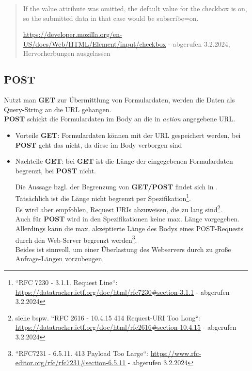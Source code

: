 \blockquote[{\url{https://developer.mozilla.org/en-US/docs/Web/HTML/Element/input/checkbox} - abgerufen 3.2.2024, Hervorherbungen ausgelassen}]{
    If the value attribute was omitted, the default value for the checkbox is on, so the submitted data in that case would be subscribe=on.
}

\subsection{POST}

Nutzt man \textbf{GET} zur Übermittlung von Formulardaten, werden die Daten als Query-String an die URL gehangen.\\

\noindent
\textbf{POST} schickt die Formulardaten im Body an die in \textit{action} angegebene URL.

\begin{itemize}
    \item Vorteile \textbf{GET}: Formulardaten können mit der URL gespeichert werden, bei \textbf{POST} geht das nicht, da diese im Body verborgen sind
    \item Nachteile \textbf{GET}: bei \textbf{GET} ist die Länge der eingegebenen Formulardaten begrenzt, bei \textbf{POST} nicht.
    \begin{tcolorbox}[colback=red!20,color=white,title=Anmerkung]
    Die Aussage bzgl. der Begrenzung von \textbf{GET/POST} findet sich in \cite[409]{Oec22}.\\
    Tatsächlich ist die Länge nicht begrenzt per Spezifikation\footnote{``RFC 7230 - 3.1.1.  Request Line``: \url{https://datatracker.ietf.org/doc/html/rfc7230#section-3.1.1} - abgerufen 3.2.2024}. \\
    Es wird aber empfohlen, Request URIs abzuweisen, die zu lang sind\footnote{siehe bspw. ``RFC 2616 - 10.4.15 414 Request-URI Too Long``: \url{https://datatracker.ietf.org/doc/html/rfc2616#section-10.4.15} - abgerufen 3.2.2024
    }.\\
    Auch für \textbf{POST} wird in den Spezifikationen keine max. Länge vorgegeben.
    Allerdings kann die max. akzeptierte Länge des Bodys eines POST-Requests durch den Web-Server begrenzt werden\footnote{
        ``RFC7231 - 6.5.11.  413 Payload Too Large``: \url{https://www.rfc-editor.org/rfc/rfc7231#section-6.5.11} - abgerufen 3.2.2024
    }.\\
    Beides ist sinnvoll, um einer Überlastung des Webservers durch zu große Anfrage-Längen vorzubeugen.
    \end{tcolorbox}
\end{itemize}

